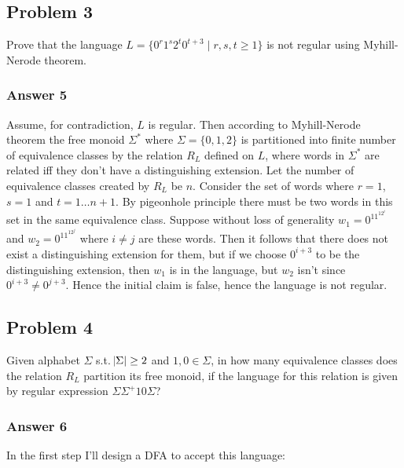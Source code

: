 \documentclass[11pt]{article}
\begin{document}
\subsection{Problem 3}
\label{sec:orgheadline8}
Prove that the language \(L=\{0^r1^s2^t0^{t+3} \;|\; r,s,t \geq 1\}\) is not
regular using Myhill-Nerode theorem.

\subsubsection{Answer 5}
\label{sec:orgheadline7}
Assume, for contradiction, \(L\) is regular.  Then according to Myhill-Nerode
theorem the free monoid \(\Sigma^*\) where \(\Sigma = \{0, 1, 2\}\) is
partitioned into finite number of equivalence classes by the relation \(R_L\)
defined on \(L\), where words in \(\Sigma^*\) are related iff they don't have a
distinguishing extension.  Let the number of equivalence classes created by
\(R_L\) be \(n\).  Consider the set of words where \(r=1\), \(s=1\) and \(t=1 \dots
    n + 1\).  By pigeonhole principle there must be two words in this set in the
same equivalence class.  Suppose without loss of generality \(w_1 =
    0^11^12^i\) and \(w_2 = 0^11^12^j\) where \(i \neq j\) are these words.  Then it
follows that there does not exist a distinguishing extension for them, but
if we choose \(0^{i+3}\) to be the distinguishing extension, then \(w_1\) is in
the language, but \(w_2\) isn't since \(0^{i+3} \neq 0^{j+3}\).  Hence the
initial claim is false, hence the language is not regular.

\subsection{Problem 4}
\label{sec:orgheadline10}
Given alphabet \(\Sigma\) s.t. \(\abs{\Sigma} \geq 2\) and \(1,0 \in \Sigma\), in
how many equivalence classes does the relation \(R_L\) partition its free
monoid, if the language for this relation is given by regular expression
\(\Sigma\Sigma^+10\Sigma\)?

\subsubsection{Answer 6}
\label{sec:orgheadline9}
In the first step I'll design a DFA to accept this language:
\end{document}
